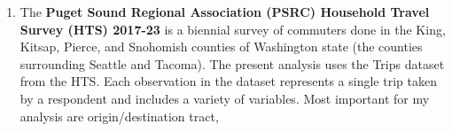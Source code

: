 \documentclass[
]{article}
\providecommand{\tightlist}{%
  \setlength{\itemsep}{0pt}\setlength{\parskip}{0pt}}
\begin{document}
\begin{enumerate}
\def\labelenumi{\arabic{enumi}.}
\tightlist
\item
  The \textbf{Puget Sound Regional Association (PSRC) Household Travel
  Survey (HTS) 2017-23} is a biennial survey of commuters done in the
  King, Kitsap, Pierce, and Snohomish counties of Washington state (the
  counties surrounding Seattle and Tacoma). The present analysis uses
  the Trips dataset from the HTS. Each observation in the dataset
  represents a single trip taken by a respondent and includes a variety
  of variables. Most important for my analysis are origin/destination
  tract,
\end{enumerate}
\end{document}
